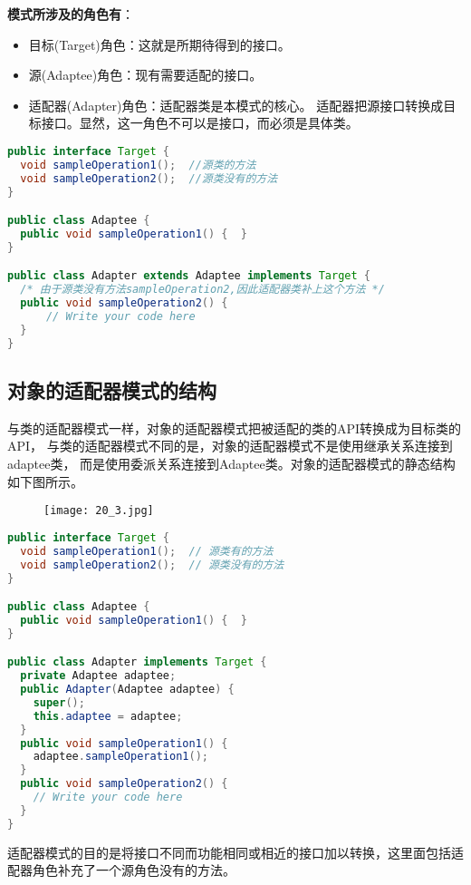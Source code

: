 \documentclass[../main.tex]{subfiles}
\begin{document}
\textbf{模式所涉及的角色有}：
\begin{itemize}
  \item 目标(Target)角色：这就是所期待得到的接口。
  \item 源(Adaptee)角色：现有需要适配的接口。
  \item 适配器(Adapter)角色：适配器类是本模式的核心。
    适配器把源接口转换成目标接口。显然，这一角色不可以是接口，而必须是具体类。
\end{itemize}
%
\begin{lstlisting}[language=java]
public interface Target {
  void sampleOperation1();  //源类的方法
  void sampleOperation2();  //源类没有的方法
}

public class Adaptee {
  public void sampleOperation1() {  }
}

public class Adapter extends Adaptee implements Target {
  /* 由于源类没有方法sampleOperation2,因此适配器类补上这个方法 */
  public void sampleOperation2() {
      // Write your code here
  }
}
\end{lstlisting}
%
\subsection{对象的适配器模式的结构}
与类的适配器模式一样，对象的适配器模式把被适配的类的API转换成为目标类的API，
与类的适配器模式不同的是，对象的适配器模式不是使用继承关系连接到adaptee类，
而是使用委派关系连接到Adaptee类。对象的适配器模式的静态结构如下图所示。
%
\begin{figure}[H]
  \texttt{[image: 20\_3.jpg]}
\end{figure}
%
\begin{lstlisting}[language=java]
public interface Target {
  void sampleOperation1();  // 源类有的方法
  void sampleOperation2();  // 源类没有的方法
}

public class Adaptee {
  public void sampleOperation1() {  }
}

public class Adapter implements Target {
  private Adaptee adaptee;
  public Adapter(Adaptee adaptee) {
    super();
    this.adaptee = adaptee;
  }
  public void sampleOperation1() {
    adaptee.sampleOperation1();
  }
  public void sampleOperation2() {
    // Write your code here
  }
}
\end{lstlisting}
%
适配器模式的目的是将接口不同而功能相同或相近的接口加以转换，这里面包括适配器角色补充了一个源角色没有的方法。
\end{document}
